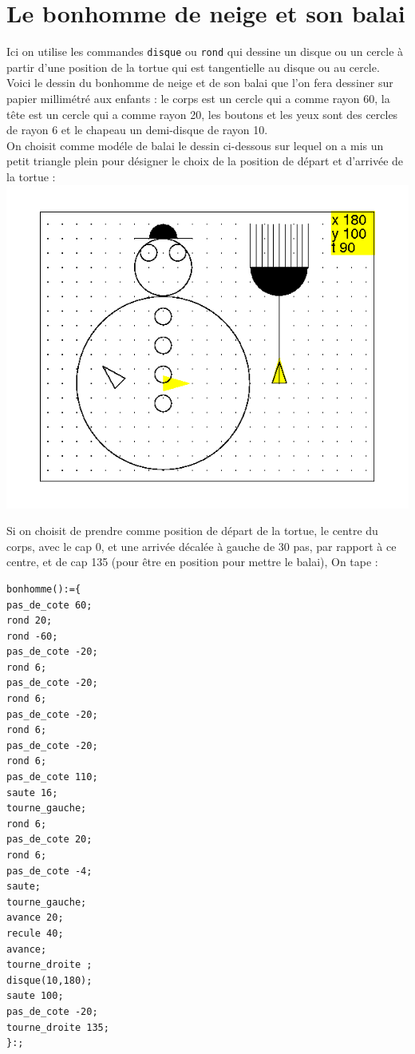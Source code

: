 \documentclass[a4paper,11pt]{book}
\begin{document}
\section{Le bonhomme de neige et son balai}
Ici on utilise les commandes {\tt disque} ou {\tt rond} qui dessine un disque
ou un cercle \`a partir d'une position de la tortue qui est tangentielle au 
disque ou au cercle.\\
Voici le dessin du bonhomme de neige et de son balai que l'on fera dessiner 
sur papier millim\'etr\'e aux enfants :
le corps est un cercle qui a comme rayon 60, la t\^ete est un cercle qui a
 comme rayon 20, les boutons et les yeux sont des cercles de rayon 6 et
 le chapeau un demi-disque de rayon 10.\\
On choisit comme mod\'ele de balai le dessin ci-dessous sur lequel on a 
mis un petit triangle plein pour d\'esigner le choix de la position de d\'epart
et d'arriv\'ee de la tortue :\\
%
\includegraphics[width=\textwidth]{tortneige}

Si on choisit de prendre comme position de d\'epart 
de la tortue, le centre du corps, avec le cap 0, et une arriv\'ee d\'ecal\'ee 
\`a gauche de 30 pas, par rapport \`a ce centre, et de cap 135 (pour \^etre en position pour mettre le balai),
 On tape :
\begin{verbatim}
bonhomme():={
pas_de_cote 60;
rond 20;
rond -60;
pas_de_cote -20;
rond 6;
pas_de_cote -20;
rond 6;
pas_de_cote -20;
rond 6;
pas_de_cote -20;
rond 6;
pas_de_cote 110;
saute 16;
tourne_gauche;
rond 6;
pas_de_cote 20;
rond 6;
pas_de_cote -4;
saute;
tourne_gauche;
avance 20;
recule 40;
avance;
tourne_droite ;
disque(10,180);
saute 100;
pas_de_cote -20;
tourne_droite 135;
}:;
\end{verbatim}
\end{document}
